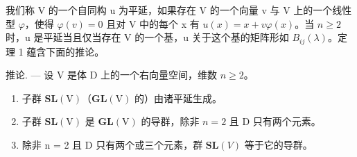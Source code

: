 我们称 V 的一个自同构 u 为平延，如果存在 V 的一个向量 v 与 V 上的一个线性型 \(\varphi\)，使得 \(\varphi(v)=0\) 且对 V 中的每个 x 有 \(u(x)=x+v\varphi(x)\)。当 \(n\geqslant2\) 时，u 是平延当且仅当存在 V 的一个基，u 关于这个基的矩阵形如 \(B_{ij}(\lambda)\)。定理 1 蕴含下面的推论。

推论. --- 设 V 是体 D 上的一个右向量空间，维数 \(n \geqslant 2\)。

\begin{enumerate}
\def\labelenumi{\alph{enumi})}
\item
  子群 \(\mathbf{SL}(\mathrm{V})\)（\(\mathbf{GL}(\mathrm{V})\) 的）由诸平延生成。
\item
  子群 \(\mathbf{SL}(\mathrm{V})\) 是 \(\mathbf{GL}(\mathrm{V})\) 的导群，除非 \(n = 2\) 且 D 只有两个元素。
\item
  除非 n = 2 且 D 只有两个或三个元素，群 \(\mathbf{SL}(V)\) 等于它的导群。
\end{enumerate}

